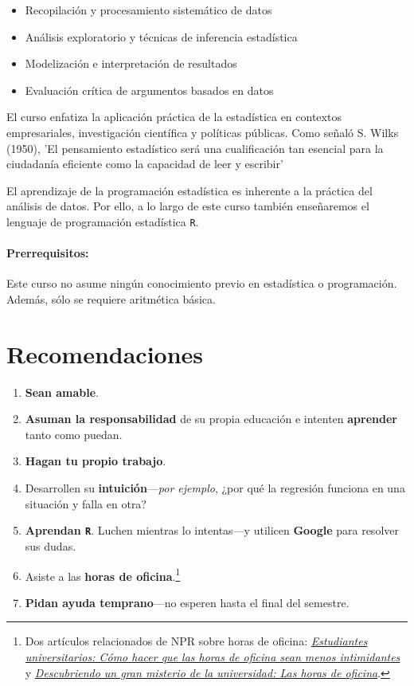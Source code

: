 \documentclass[10pt]{article}
\begin{document}
	\begin{itemize}
		\item Recopilación y procesamiento sistemático de datos
		\item Análisis exploratorio y técnicas de inferencia estadística
		\item Modelización e interpretación de resultados
		\item Evaluación crítica de argumentos basados en datos
	\end{itemize}
	
	
	El curso enfatiza la aplicación práctica de la estadística en contextos empresariales, investigación científica y políticas públicas. Como señaló S. Wilks (1950), 'El pensamiento estadístico será una cualificación tan esencial para la ciudadanía eficiente como la capacidad de leer y escribir'
	
	El aprendizaje de la programación estadística es inherente a la práctica del análisis de datos. Por ello, a lo largo de este curso también enseñaremos el lenguaje de programación estadística \texttt{{R}}.
	
	\paragraph{Prerrequisitos:} Este curso no asume ningún conocimiento previo en estadística o programación. Además, sólo se requiere aritmética básica.
	
	
	\section*{Recomendaciones}
	
	\begin{enumerate}
		\item \textbf{Sean amable}.
		\item \textbf{Asuman la responsabilidad} de su propia educación e intenten \textbf{aprender} tanto como puedan.
		\item \textbf{Hagan tu propio trabajo}.
		\item Desarrollen su \textbf{intuición}---\textit{por ejemplo}, ¿por qué la regresión funciona en una situación y falla en otra?
		\item \textbf{Aprendan \texttt{R}}. Luchen mientras lo intentas---y utilicen \textbf{Google} para resolver sus dudas.
		\item Asiste a las \textbf{horas de oficina}.\footnote{Dos artículos relacionados de NPR sobre horas de oficina: \href{https://www.npr.org/2019/10/05/678815966/college-students-how-to-make-office-hours-less-scary}{\textit{Estudiantes universitarios: Cómo hacer que las horas de oficina sean menos intimidantes}} y \href{https://www.npr.org/2019/10/02/766568824/uncovering-a-huge-mystery-of-college-office-hours}{\textit{Descubriendo un gran misterio de la universidad: Las horas de oficina}}.}
		\item \textbf{Pidan ayuda temprano}---no esperen hasta el final del semestre.
	\end{enumerate}
	
\end{document}
